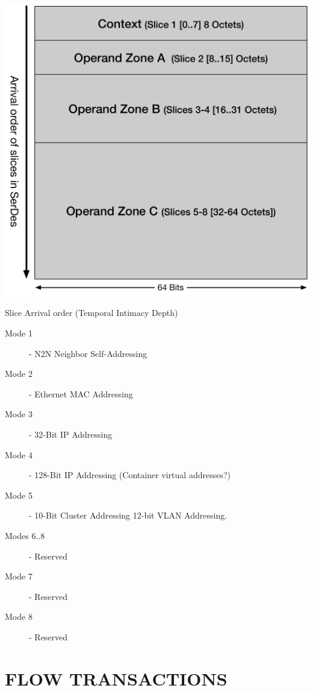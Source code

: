 \documentclass[../HFT-main.tex]{subfiles}
\begin{document}
\begin{marginfigure}
   \hspace{-18pt}    \includegraphics[width=1.12\linewidth]{../figures/slice-arrival.pdf}
  \caption{Slice Arrival order (Temporal  Intimacy Depth)}
\end{marginfigure}

\begin{description}
\item [Mode 1]- N2N Neighbor Self-Addressing
\item [Mode 2]- Ethernet MAC Addressing
\item [Mode 3]- 32-Bit IP Addressing
\item [Mode 4]- 128-Bit IP Addressing (Container virtual addresses?)
\item [Mode 5]- 10-Bit Cluster Addressing 12-bit VLAN Addressing.
\item [Modes 6..8]- Reserved
\item [Mode 7]- Reserved
\item [Mode 8]- Reserved
\end{description}


\newpage
\section{FLOW TRANSACTIONS}
\end{document}
